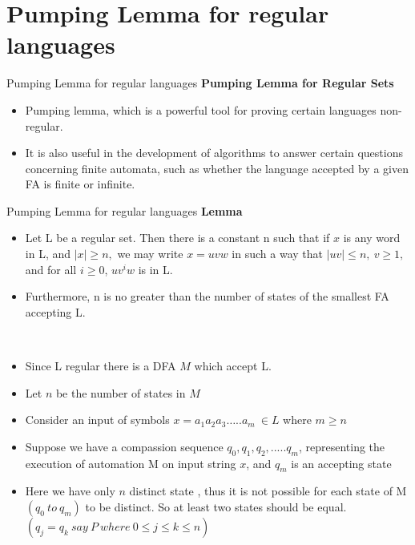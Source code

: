 \documentclass{beamer}
\begin{document}
\section{Pumping Lemma for regular languages }
\begin{frame}{Pumping Lemma for regular languages }
	\textbf{Pumping Lemma for Regular Sets}
	\begin{itemize}
		\item Pumping lemma, which is a powerful tool for proving certain 
		languages non-regular.

		\item It is also useful in the development of algorithms to answer certain 
		questions concerning finite automata, such as whether the language 
		accepted by a given FA is finite or infinite.
	\end{itemize}
\end{frame}
\begin{frame}{Pumping Lemma for regular languages }
	\textbf{Lemma}
	\begin{itemize}
		\item 	Let L be a regular set. Then there is a constant n such that if $x$ is any word 
		in L, and $|x| \ge n,$ we may write $x=uvw$ in such a way that $|uv| \leq n,\  v \geq 1,$ 
		and for all $i\ge 0$, $uv^iw$ is in L. 
		\item Furthermore, n is no greater than the number 
		of states of the smallest FA accepting L.
	\end{itemize}
\proofname \\
\begin{itemize}
	\item Since L regular there is a DFA $M$ which accept L.
	\item Let $n$ be  the number of states in $M$
	\item Consider an input of symbols $x=a_1a_2a_3…..a_m \  \in L$  where $m \geq n$
	\item Suppose we have a compassion sequence $ q_0,q_1,q_2,.....q_m $, representing the execution of automation M on input string $x$, and $q_m$ is an accepting state
	\item Here we have only $n$ distinct state , thus it is not possible for each state of M $(q_0 \ to \ q_m)$ to be distinct. So  at least two states should be equal. $(q_j=q_k \ say\  P \   where \ 0\leq j \leq k \leq n)$
\end{itemize}
\end{frame}
\end{document}
